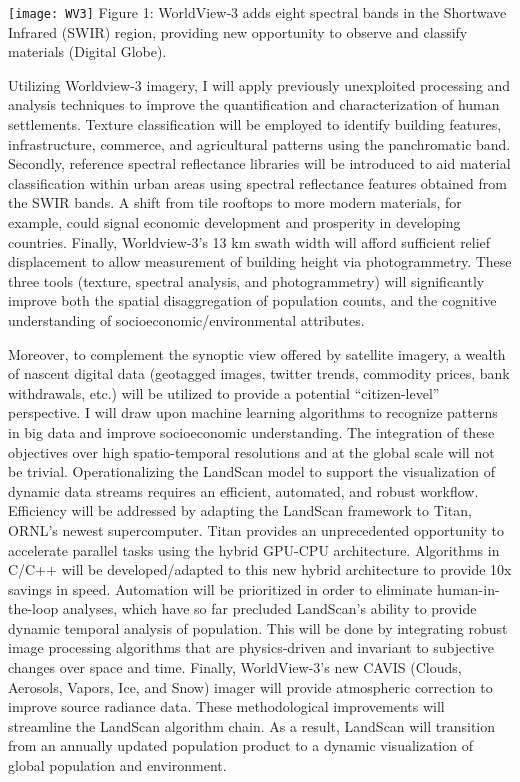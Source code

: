 \documentclass[11pt,letterpaper,sans]{moderncv}
\begin{document}
\begin{table}

  \texttt{[image: WV3]}
Figure 1: WorldView-3 adds eight spectral bands in the Shortwave Infrared (SWIR) region, providing new opportunity to observe and classify materials (Digital Globe).
\ 

Utilizing Worldview-3 imagery, I will apply previously unexploited processing and analysis techniques to improve the quantification and characterization of human settlements. Texture classification will be employed to identify building features, infrastructure, commerce, and agricultural patterns using the panchromatic band. Secondly, reference spectral reflectance libraries will be introduced to aid material classification within urban areas using spectral reflectance features obtained from the SWIR bands. A shift from tile rooftops to more modern materials, for example, could signal economic development and prosperity in developing countries. Finally, Worldview-3's 13 km swath width will afford sufficient relief displacement to allow measurement of building height via photogrammetry. These three tools (texture, spectral analysis, and photogrammetry) will significantly improve both the spatial disaggregation of population counts, and the cognitive understanding of socioeconomic/environmental attributes.  
\newline

Moreover, to complement the synoptic view offered by satellite imagery, a wealth of nascent digital data (geotagged images, twitter trends, commodity prices, bank withdrawals, etc.) will be utilized to provide a potential ``citizen-level'' perspective. I will draw upon machine learning algorithms to recognize patterns in big data and improve socioeconomic understanding. 
The integration of these objectives over high spatio-temporal resolutions and at the global scale will not be trivial. Operationalizing the LandScan model to support the visualization of dynamic data streams requires an efficient, automated, and robust workflow. Efficiency will be addressed by adapting the LandScan framework to Titan, ORNL's newest supercomputer. Titan provides an unprecedented opportunity to accelerate parallel tasks using the hybrid GPU-CPU architecture. Algorithms in C/C++ will be developed/adapted to this new hybrid architecture to provide 10x savings in speed. Automation will be prioritized in order to eliminate human-in-the-loop analyses, which have so far precluded LandScan's ability to provide dynamic temporal analysis of population. This will be done by integrating robust image processing algorithms that are physics-driven and invariant to subjective changes over space and time. Finally, WorldView-3's new CAVIS (Clouds, Aerosols, Vapors, Ice, and Snow) imager will provide atmospheric correction to improve source radiance data. These methodological improvements will streamline the LandScan algorithm chain. As a result, LandScan will transition from an annually updated population product to a dynamic visualization of global population and environment. 
\newline


\end{table}
\end{document}

